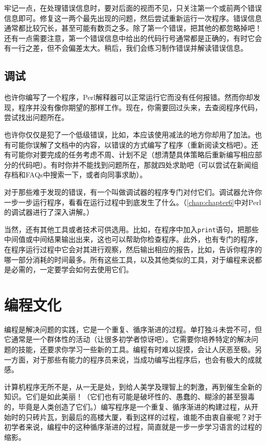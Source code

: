 牢记一点，在处理错误信息时，要对后面的视而不见，只关注第一个或前两个错误信息即可。修复这一两个最先出现的问题，然后尝试重新运行一次程序。错误信息通常都比较冗长，甚至可能有数页之多。除了第一个错误，把其他的都忽略掉吧！还有一点需要注意，第一个错误信息中给出的代码行号通常都是正确的，有时它会有一行之差，但不会偏差太大。稍后，我们会练习制作错误并解读错误信息。

\subsection{调试}
也许你编写了一个程序，Perl解释器可以正常运行它而没有任何报错。然而你却发现，程序并没有像你期望的那样工作。现在，你需要回过头来，去查阅程序代码，尝试找出问题所在。

也许你仅仅是犯了一个低级错误，比如，本应该使用减法的地方你却用了加法。也有可能你误解了文档中的内容，以错误的方式编写了程序（重新阅读文档吧）。还有可能你对要完成的任务考虑不周、计划不足（想清楚具体策略后重新编写相应部分的代码吧）。有时你并不能找到问题所在，那就四处求助吧（可以尝试在新闻组存档和FAQs中搜索一下，或者向同事求助）。

对于那些难于发现的错误，有一个叫做调试器的程序专门对付它们。调试器允许你一步一步运行程序，看看在运行过程中到底发生了什么。（\autoref{chap:chapter6}中对Perl的调试器进行了深入讲解。）

当然，还有其他工具或者技术可供选用。比如，在程序中加入\verb|print|语句，把那些中间值或中间结果输出出来，这也可以帮助你检查程序。此外，也有专门的程序，在程序运行过程中它会对其进行观察，然后输出相应的报告，比如，告诉你程序的哪一部分消耗的时间最多。所有这些工具，以及其他类似的工具，对于编程来说都是必需的，一定要学会如何去使用它们。

\section{编程文化}
编程是解决问题的实践，它是一个重复、循序渐进的过程。单打独斗未尝不可，但它通常是一个群体性的活动（让很多初学者惊讶吧）。它需要你培养特定的解决问题的技能，还要求你学习一些新的工具。编程有时难以捉摸，会让人厌恶至极。另一方面，对于那些有能力的程序员来说，当成功编写出程序后，也会有极大的成就感。

计算机程序无所不是，从一无是处，到给人美学及理智上的刺激，再到催生全新的知识。它们是如此美丽！（它们也有可能是破坏性的、愚蠢的、糊涂的甚至狠毒的，毕竟是人类创造了它们。）编写程序是一个重复、循序渐进的构建过程，从开始时的只砖片瓦，到最后的高楼大厦，看到这样的过程，谁能不由衷自豪呢？对于初学者来说，编程中的这种循序渐进的过程，简直就是一步一步学习语言的过程的缩影。

